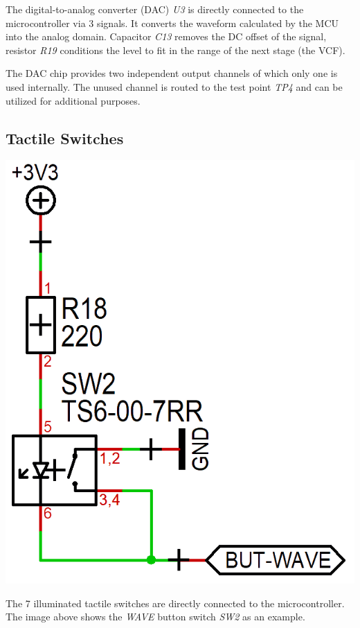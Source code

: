\documentclass{scrartcl}
\begin{document}
The digital-to-analog converter (DAC) \emph{U3} is directly connected to the microcontroller via 3 signals. It converts the waveform calculated by the MCU into the analog domain. Capacitor \emph{C13} removes the DC offset of the signal, resistor \emph{R19} conditions the level to fit in the range of the next stage (the VCF).

The DAC chip provides two independent output channels of which only one is used internally. The unused channel is routed to the test point \emph{TP4} and can be utilized for additional purposes.

\subsection{Tactile Switches}

\begin{center}
    \includegraphics[scale=0.25]{assets/schema-switch.png}
\end{center}

The 7 illuminated tactile switches are directly connected to the microcontroller. The image above shows the \emph{WAVE} button switch \emph{SW2} as an example.
\end{document}

